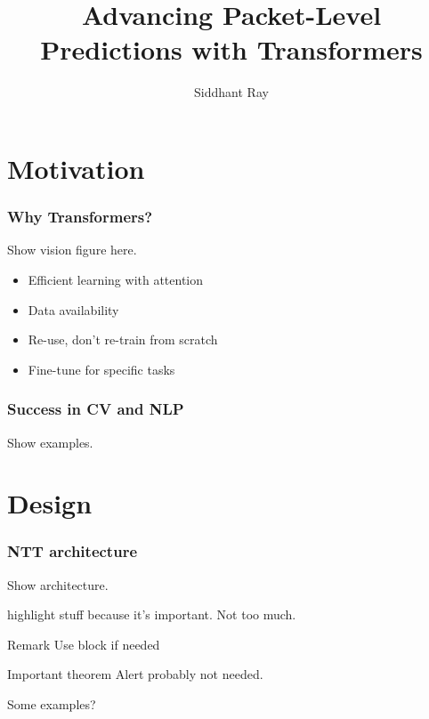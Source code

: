 \documentclass{beamer}
\title[Master Thesis] %
{Advancing Packet-Level Predictions with Transformers}
\author[Siddhant Ray] %
{Siddhant Ray}
\institute[ETH Zürich] %
{
  Dept. of Information Technology and Electrical Engineering(D-ITET) \\
  ETH Zürich
}
\date[September 2022] %
\begin{document}
\frame{\titlepage}


%


\section{Motivation}

\begin{frame}
\frametitle{Why Transformers?}

Show vision figure here.

\begin{itemize}
    \item<1-> Efficient learning with attention
    \item<1-> Data availability
    \item<2-> Re-use, don't re-train from scratch
    \item<2-> Fine-tune for specific tasks
    \end{itemize}
\end{frame}



\begin{frame}
\frametitle{Success in CV and NLP}
Show \pause
examples.
\end{frame}

\section{Design}

\begin{frame}
\frametitle{NTT architecture}
Show architecture. \pause

\alert{highlight} stuff because it's important.
Not too much. \pause 

\begin{block}{Remark}
Use block if needed
\end{block}
\pause

\begin{alertblock}{Important theorem}
Alert probably not needed.
\end{alertblock}
\pause

\begin{examples}
Some examples?
\end{examples}
\end{frame}
\end{document}
